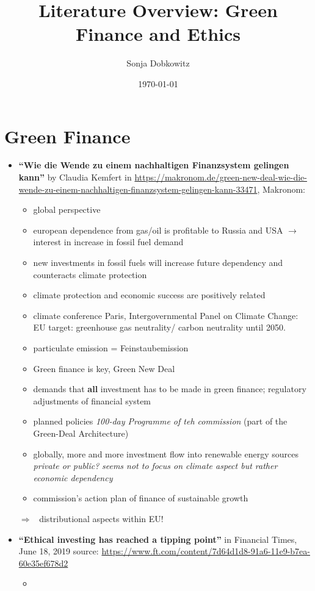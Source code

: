 \documentclass{article}
\title{Literature Overview: Green Finance and Ethics}
\author{Sonja Dobkowitz}
\date{\today}
\newcommand{\ar}{$\Rightarrow$ \ }
\begin{document}
\maketitle

\section{Green Finance }
\begin{itemize}
	\item \textbf{``Wie die Wende zu einem nachhaltigen Finanzsystem gelingen kann''} by Claudia Kemfert in  \url{https://makronom.de/green-new-deal-wie-die-wende-zu-einem-nachhaltigen-finanzsystem-gelingen-kann-33471}, Makronom: 
	\begin{itemize}
		\item global perspective
		\item european dependence from gas/oil is profitable to Russia and USA $\rightarrow$ interest in increase in fossil fuel demand
		\item new investments in fossil fuels will increase future dependency and counteracts climate protection
		\item climate protection and economic success are positively related
		\item climate conference Paris, Intergovernmental Panel on Climate Change: EU target: greenhouse gas neutrality/ carbon neutrality until 2050. 
		\item particulate emission = Feinstaubemission
		\item Green finance is key, Green New Deal 
		\item demands that \textbf{all} investment has to be made in green finance; regulatory adjustments of financial system
		\item planned policies \textit{100-day Programme of teh commission} (part of the Green-Deal Architecture)
		\item globally, more and more investment flow into renewable energy sources \textit{private or public?}
		\textit{seems not to focus on climate aspect but rather economic dependency}
		\item commission's action plan of finance of sustainable growth 
	\end{itemize}
\ar distributional aspects within EU! 
\item \textbf{``Ethical investing has reached a tipping point''} in Financial Times, June 18, 2019 source: \url{https://www.ft.com/content/7d64d1d8-91a6-11e9-b7ea-60e35ef678d2}
\begin{itemize} 
	\item \begin{quote}
		

\end{quote}
\end{itemize}
\end{itemize}
\end{document}
